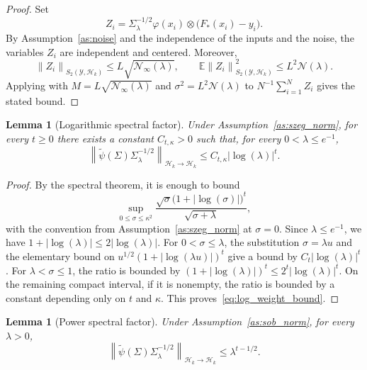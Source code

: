 \documentclass[11pt]{article}
\numberwithin{equation}{section}
\theoremstyle{plain}
\newtheorem{lemma}[theorem]{Lemma}
\theoremstyle{definition}
\theoremstyle{remark}
\newcommand{\Hs}{\mathcal{H}}
\newcommand{\Y}{\mathcal{Y}}
\newcommand{\EXP}{\mathbb{E}}
\newcommand{\norm}[1]{\left\lVert#1\right\rVert}
\newcommand{\tpsi}{\widetilde{\psi}}
\newcommand{\abs}[1]{\left|#1\right|}
\begin{document}
\begin{proof}
Set
\[
Z_i=\Sigma_\lambda^{-1/2}\varphi(x_i)\otimes
\bigl(F_*(x_i)-y_i\bigr).
\]
By Assumption~\ref{as:noise} and the independence of the inputs and the
noise, the variables $Z_i$ are independent and centered. Moreover,
\[
\norm{Z_i}_{S_2(\Y,\Hs_k)}
\leq L\sqrt{\mathcal{N}_{\infty}(\lambda)},
\qquad
\EXP\norm{Z_i}_{S_2(\Y,\Hs_k)}^2
\leq L^2\mathcal{N}(\lambda).
\]
Applying \cite[Proposition~2]{caponnetto2007optimal} with
$M=L\sqrt{\mathcal{N}_{\infty}(\lambda)}$ and $\sigma^2=L^2\mathcal{N}(\lambda)$
to $N^{-1}\sum_{i=1}^N Z_i$ gives the stated bound.
\end{proof}

\begin{lemma}[Logarithmic spectral factor]
\label{lem:log_weight}
Under Assumption~\ref{as:szeg_norm}, for every $t\geq0$ there exists a
constant $C_{t,\kappa}>0$ such that, for every $0<\lambda\leq e^{-1}$,
\begin{equation}
\norm{\tpsi(\Sigma)\Sigma_\lambda^{-1/2}}_{\Hs_k\to\Hs_k}
\leq
C_{t,\kappa}\abs{\log(\lambda)}^t.
\label{eq:log_weight_bound}
\end{equation}
\end{lemma}

\begin{proof}
By the spectral theorem, it is enough to bound
\[
\sup_{0\leq\sigma\leq\kappa^2}
\frac{\sqrt{\sigma}\bigl(1+\abs{\log(\sigma)}\bigr)^t}
{\sqrt{\sigma+\lambda}},
\]
with the convention from Assumption~\ref{as:szeg_norm} at $\sigma=0$.
Since $\lambda\leq e^{-1}$, we have $1+|\log(\lambda)|\leq2|\log(\lambda)|$.
For $0<\sigma\leq\lambda$, the substitution $\sigma=\lambda u$ and the
elementary bound on $u^{1/2}(1+|\log(\lambda u)|)^t$ give a bound by
$C_t|\log(\lambda)|^t$. For $\lambda<\sigma\leq1$, the ratio is bounded
by $(1+|\log(\lambda)|)^t\leq2^t|\log(\lambda)|^t$. On the remaining compact interval, if it is
nonempty, the ratio is bounded by a constant depending only on $t$ and
$\kappa$. This proves~\eqref{eq:log_weight_bound}.
\end{proof}

\begin{lemma}[Power spectral factor]
\label{lem:power_weight}
Under Assumption~\ref{as:sob_norm}, for every $\lambda>0$,
\begin{equation}
\norm{\tpsi(\Sigma)\Sigma_\lambda^{-1/2}}_{\Hs_k\to\Hs_k}
\leq
\lambda^{t-1/2}.
\label{eq:power_weight_bound}
\end{equation}
\end{lemma}
\end{document}
